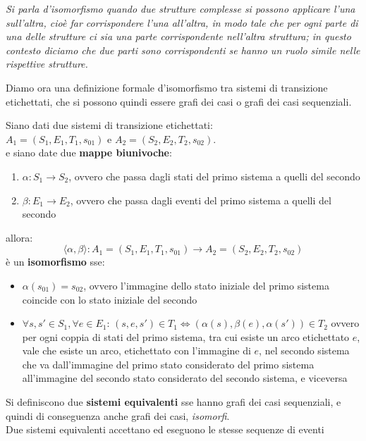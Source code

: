 \begin{shaded}
\begin{center}
  \textit{Si parla d'isomorfismo quando due strutture complesse si possono
    applicare l'una sull'altra, cioè far corrispondere l'una all'altra, in modo
    tale che per ogni parte di una delle strutture ci sia una parte
    corrispondente nell'altra struttura; in questo contesto diciamo che due
    parti sono corrispondenti se hanno un ruolo simile nelle rispettive
    strutture.}
\end{center}
Diamo ora una definizione formale d'isomorfismo tra sistemi di transizione
etichettati, che si possono quindi essere grafi dei casi o grafi dei casi
sequenziali.
\begin{definizione}
  Siano dati due sistemi di transizione etichettati:\\
  $A_1 = (S_1,E_1,T_1,s_{01})$ e $A_2 = (S_2 , E_2 , T_2 , s_{02})$.\\
  e siano date due \textbf{mappe biunivoche}:
  \begin{enumerate}
    \item $\alpha:S_1\to S_2$, ovvero che passa dagli stati del primo sistema a
    quelli del secondo
    \item $\beta:E_1\to E_2$, ovvero che passa dagli eventi del primo sistema a
    quelli del secondo
  \end{enumerate}
  allora:
  \[\langle \alpha,\beta\rangle:A_1= (S_1 , E_1 , T_1 ,s_{01})\to A_2 = (S_2 ,
    E_2 , T_2 , s_{02})\]
  è un \textbf{isomorfismo} sse:
  \begin{itemize}
    \item $\alpha(s_{01})=s_{02}$, ovvero l'immagine dello stato iniziale del
    primo sistema coincide con lo stato iniziale del secondo
    \item $\forall s,s'\in S_1,\forall e\in E_1:\,(s,e,s')\in T_1
    \Leftrightarrow (\alpha(s),\beta(e),\alpha(s'))\in T_2$ ovvero per ogni
    coppia di stati del primo sistema, tra cui esiste un arco etichettato $e$,
    vale che esiste un arco, etichettato con l'immagine di $e$, nel secondo
    sistema che va dall'immagine del primo stato considerato del primo sistema
    all'immagine del secondo stato considerato del secondo sistema, e viceversa
  \end{itemize}
\end{definizione}
\begin{definizione}
  Si definiscono due \textbf{sistemi equivalenti} sse hanno grafi dei casi
  sequenziali, e quindi di conseguenza anche grafi dei casi, \emph{isomorfi}.\\
  Due sistemi equivalenti accettano ed eseguono le stesse sequenze di eventi
\end{definizione}
\end{shaded}
